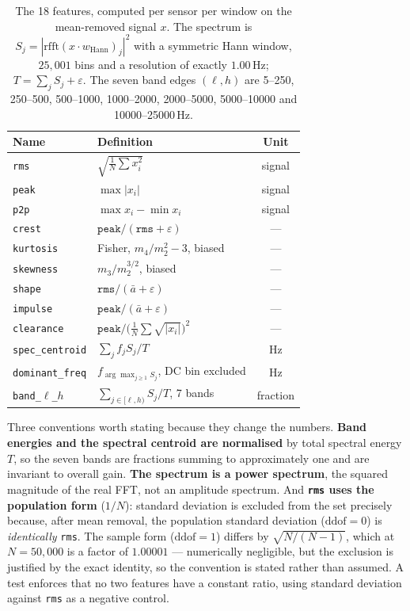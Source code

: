 \documentclass[conference]{IEEEtran}
\begin{document}
\begin{table}[t]
\centering
\caption{The 18 features, computed per sensor per window on the mean-removed
signal $x$. The spectrum is $S_j=|\mathrm{rfft}(x\cdot w_{\mathrm{Hann}})_j|^2$
with a symmetric Hann window, $25{,}001$ bins and a resolution of exactly
$1.00$\,Hz; $T=\sum_j S_j+\varepsilon$. The seven band edges $(\ell,h)$ are 5--250, 250--500, 500--1000, 1000--2000, 2000--5000, 5000--10000 and 10000--25000\,Hz.}
\label{tab:features}
\footnotesize
\setlength{\tabcolsep}{3pt}
\begin{tabular}{llc}
\toprule
Name & Definition & Unit \\
\midrule
\texttt{rms} & $\sqrt{\frac{1}{N}\sum x_i^2}$ & signal \\
\texttt{peak} & $\max|x_i|$ & signal \\
\texttt{p2p} & $\max x_i-\min x_i$ & signal \\
\texttt{crest} & $\texttt{peak}/(\texttt{rms}+\varepsilon)$ & --- \\
\texttt{kurtosis} & Fisher, $m_4/m_2^2-3$, biased & --- \\
\texttt{skewness} & $m_3/m_2^{3/2}$, biased & --- \\
\texttt{shape} & $\texttt{rms}/(\bar{a}+\varepsilon)$ & --- \\
\texttt{impulse} & $\texttt{peak}/(\bar{a}+\varepsilon)$ & --- \\
\texttt{clearance} & $\texttt{peak}/\big(\tfrac{1}{N}\sum\sqrt{|x_i|}\big)^2$ & --- \\
\texttt{spec\_centroid} & $\sum_j f_j S_j / T$ & Hz \\
\texttt{dominant\_freq} & $f_{\arg\max_{j\geq1} S_j}$, DC bin excluded & Hz \\
\texttt{band\_$\ell$\_$h$} & $\sum_{j\in[\ell,h)} S_j / T$, 7 bands & fraction \\
\bottomrule
\end{tabular}
\end{table}

Three conventions worth stating because they change the numbers. \textbf{Band
energies and the spectral centroid are normalised} by total spectral energy
$T$, so the seven bands are fractions summing to approximately one and are
invariant to overall gain. \textbf{The spectrum is a power spectrum}, the
squared magnitude of the real FFT, not an amplitude spectrum. And
\textbf{\texttt{rms} uses the population form} ($1/N$): standard deviation is
excluded from the set precisely because, after mean removal, the population
standard deviation ($\mathrm{ddof}=0$) is \emph{identically} \texttt{rms}. The
sample form ($\mathrm{ddof}=1$) differs by $\sqrt{N/(N-1)}$, which at
$N=50{,}000$ is a factor of $1.00001$ --- numerically negligible, but the
exclusion is justified by the exact identity, so the convention is stated
rather than assumed. A test enforces that no two features have a constant
ratio, using standard deviation against \texttt{rms} as a negative control.
\end{document}
